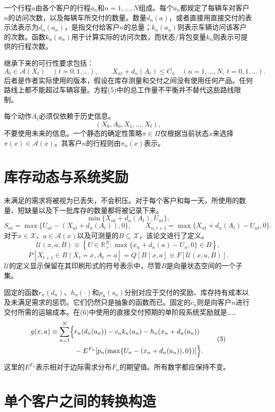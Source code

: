 \documentclass{article}
\begin{document}
一个行程$a$由各个客户的行程$a_n$和$n=1,\ldots,N$组成。每个$a_n$都规定了每辆车对客户$n$的访问次数，以及每辆车所交付的数量。数量$d_n(a)$，或者直接用直接交付的表示法表示为$d_n(a_n)$，是指交付给客户$n$的总量；$k_n(a_n)$则表示车辆访问该客户的次数。函数$k_n(a_n)$用于计算实际的访问次数，而状态/背包变量$k_n$则表示可提供的行程次数。

继承下来的可行性要求包括：
\[
A_t\in\mathcal A(X_t)\quad(t=0,1,\ldots),
\qquad
X_{nt}+d_n(A_t)\leq C_n
\quad(n=1,\ldots,N,\ t=0,1,\ldots).
\]
后者是作者实际使用的版本，假设在库存测量和交付之间没有使用任何产品。任何路线上都不能超过车辆容量。方程(5)中的总工作量不平衡并不替代这些路线限制。

每个动作$A_t$必须仅依赖于历史信息。
\[
(X_0,A_0,X_1,\ldots,X_t),
\]
不要使用未来的信息。一个静态的确定性策略$\pi\in\Pi$仅根据当前状态$x$来选择$\pi(x)\in\mathcal A(x)$。其客户$n$的行程则由$\pi_n(x)$表示。

\section*{库存动态与系统奖励}

未满足的需求将被视为已丢失，不会积压。对于每个客户和每一天，所使用的数量、短缺量以及下一批库存的数量都将被记录下来。
\[
\min\{X_{nt}+d_n(A_t),U_{nt}\},
\]
\[
S_{nt}=\max\{U_{nt}-(X_{nt}+d_n(A_t)),0\},
\qquad
X_{n,t+1}=\max\{X_{nt}+d_n(A_t)-U_{nt},0\}.
\]
对于$x\in\mathcal X$、$a\in\mathcal A(x)$以及可测量的$B\subseteq\mathcal X$，该论文进行了定义。
\[
\mathcal U(x,a,B)\equiv
\left\{U\in\mathbb R_+^N:
\max\{x_n+d_n(a)-U_n,0\}\in B\right\},
\]
\[
P[X_{t+1}\in B\mid X_t=x,A_t=a]
=Q[B\mid x,a]\equiv F[\mathcal U(x,a,B)].
\]
$\mathcal U$的定义显示保留在其印刷形式的符号表示中，尽管$B$是向量状态空间的一个子集。

固定的函数$r_n(d_n)$、$h_n(\cdot)$和$p_n(s_n)$分别对应于交付的奖励、库存持有成本以及未满足需求的惩罚。它们仍然只是抽象的函数而已。固定的$c_n$则是向客户$n$进行交付所需的运输成本。在(6)中使用的直接交付预期的单阶段系统奖励就是……
\begin{equation}
\begin{aligned}
g(x,a)\equiv\sum_{n=1}^{N}\Bigl\{
&r_n(d_n(a_n))-c_nk_n(a_n)-h_n(x_n+d_n(a_n))\\
&-E^{F_n}\!\left[p_n\!\left(\max\{U_n-(x_n+d_n(a_n)),0\}\right)\right]
\Bigr\}.
\end{aligned}
\tag{3}
\end{equation}
这里的$E^{F_n}$表示相对于边际需求分布$F_n$的期望值。所有数字都应保持不变。

\section*{单个客户之间的转换构造}
\end{document}
